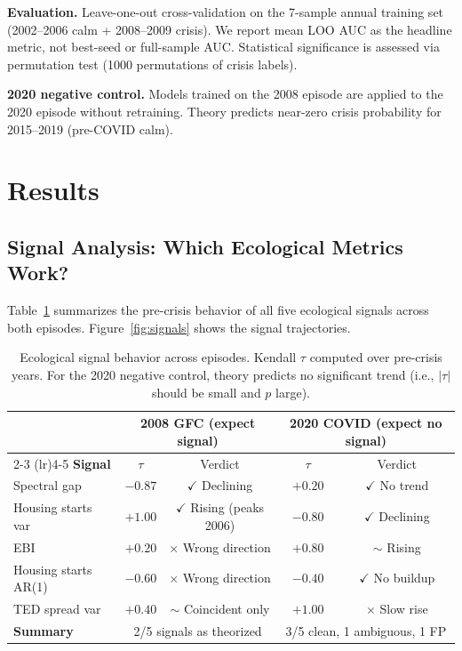 \documentclass[12pt,a4paper]{article}
\begin{document}
\textbf{Evaluation.} Leave-one-out cross-validation on the 7-sample annual training
set (2002--2006 calm + 2008--2009 crisis). We report mean LOO AUC as the headline
metric, not best-seed or full-sample AUC. Statistical significance is assessed via
permutation test (1000 permutations of crisis labels).

\textbf{2020 negative control.} Models trained on the 2008 episode are applied to the
2020 episode without retraining. Theory predicts near-zero crisis probability for
2015--2019 (pre-COVID calm).

\section{Results}

\subsection{Signal Analysis: Which Ecological Metrics Work?}

Table~\ref{tab:signals} summarizes the pre-crisis behavior of all five ecological
signals across both episodes. Figure~\ref{fig:signals} shows the signal trajectories.

\begin{table}[H]
\centering
\caption{Ecological signal behavior across episodes. Kendall $\tau$ computed over
pre-crisis years. For the 2020 negative control, theory predicts no significant trend
(i.e., $|\tau|$ should be small and $p$ large).}
\label{tab:signals}
\begin{tabular}{lcccc}
\toprule
& \multicolumn{2}{c}{\textbf{2008 GFC (expect signal)}}
& \multicolumn{2}{c}{\textbf{2020 COVID (expect no signal)}} \\
\cmidrule(lr){2-3} \cmidrule(lr){4-5}
\textbf{Signal} & $\tau$ & Verdict & $\tau$ & Verdict \\
\midrule
Spectral gap & $-0.87$ & \textcolor{green!60!black}{$\checkmark$ Declining} & $+0.20$ & \textcolor{green!60!black}{$\checkmark$ No trend} \\
Housing starts var & $+1.00$ & \textcolor{green!60!black}{$\checkmark$ Rising (peaks 2006)} & $-0.80$ & \textcolor{green!60!black}{$\checkmark$ Declining} \\
EBI & $+0.20$ & \textcolor{red!70!black}{$\times$ Wrong direction} & $+0.80$ & \textcolor{orange!80!black}{$\sim$ Rising} \\
Housing starts AR(1) & $-0.60$ & \textcolor{red!70!black}{$\times$ Wrong direction} & $-0.40$ & \textcolor{green!60!black}{$\checkmark$ No buildup} \\
TED spread var & $+0.40$ & \textcolor{orange!80!black}{$\sim$ Coincident only} & $+1.00$ & \textcolor{red!70!black}{$\times$ Slow rise} \\
\midrule
\textbf{Summary} & \multicolumn{2}{c}{2/5 signals as theorized} & \multicolumn{2}{c}{3/5 clean, 1 ambiguous, 1 FP} \\
\bottomrule
\end{tabular}
\end{table}
\end{document}
